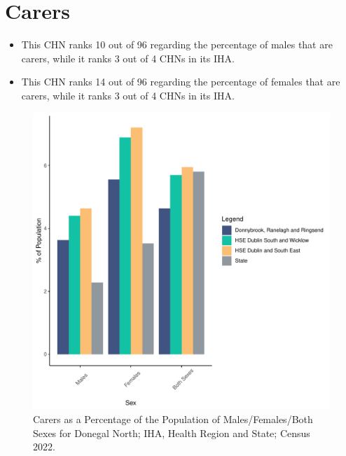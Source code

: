 \documentclass{article}
\begin{document}
\section{Carers}\label{sect:Carers}
\begin{itemize}
\item This CHN ranks  10 out of 96 regarding the percentage of males that are carers, while it ranks   3 out of 4 CHNs in its IHA.
\item This CHN ranks  14 out of 96 regarding the percentage of females that are carers, while it ranks   3 out of 4 CHNs in its IHA.
\end{itemize}
\begin{figure}[H]
	\centering
	\includegraphics[width = 150mm]{../figures/CareED.pdf}
	\caption{Carers as a Percentage of the Population of Males/Females/Both Sexes for Donegal North; IHA, Health Region and State; Census 2022.}
	\label{fig:2ae19629-1a6a-13a3-e055-000000000001}
	\end{figure}
\end{document}
